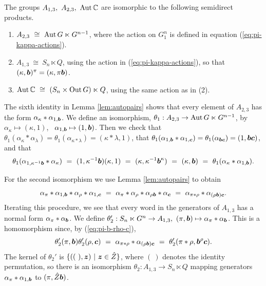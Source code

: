 \begin{prop}
The groups $A_{1,3},~ A_{2,3},~ \mathrm{Aut}\,\mathbb{C}$ 
are isomorphic to the following semidirect products.  
\begin{enumerate}[(1)]  
\item 
$A_{2,3} ~\cong~ \mathrm{Aut}\,G \ltimes G^{n-1}$, 
where the action on $G^n_1$ is defined in equation (\ref{eq:pi-kappa-actions}).
\item
$A_{1,3} ~\cong~ S_n \ltimes Q$,  
using the action in (\ref{eq:pi-kappa-actions}), so that  
$(\kappa,\boldsymbol{b})^{\pi} = (\kappa,\pi\boldsymbol{b})$. 
\item
$\mathrm{Aut}\,\mathbb{C} ~\cong~ (S_n \times \mathrm{Out}\,G) \ltimes Q$, 
using the same action as in (2). 
\end{enumerate} 
\end{prop}
\begin{pf} 
The sixth identity in Lemma \ref{lem:autopairs} shows that every element 
of $A_{2,3}$ has the form $\alpha_{\kappa}*\alpha_{1,\boldsymbol{b}}$. 
We define an isomorphism, 
$\theta_1 : A_{2,3} \to \mathrm{Aut}\,G \ltimes G^{n-1}$, by 
$\alpha_{\kappa} \mapsto (\kappa,1)$,~ $\alpha_{1,\boldsymbol{b}} \mapsto (1,\boldsymbol{b})$. 
Then we check that 
$\theta_1(\alpha_{\kappa}*\alpha_{\lambda}) 
 = \theta_1(\alpha_{\kappa*\lambda}) 
 = (\kappa*\lambda,1)$, that 
$\theta_1(\alpha_{1,\boldsymbol{b}}*\alpha_{1,\boldsymbol{c}}) 
 = \theta_1(\alpha_{\boldsymbol{b}\boldsymbol{c}}) 
 = (1,\boldsymbol{b}\boldsymbol{c})$, and that 
$$
\theta_1(\alpha_{1,\kappa^{-1}\boldsymbol{b}}*\alpha_{\kappa}) 
~=~ (1,\kappa^{-1}\boldsymbol{b})(\kappa,1) 
~=~ (\kappa,\kappa^{-1}\boldsymbol{b}^{\kappa}) 
~=~ (\kappa,\boldsymbol{b}) 
~=~ \theta_1(\alpha_{\kappa}*\alpha_{1,\boldsymbol{b}}). 
$$

\medskip\noindent 
For the second isomorphism we use Lemma \ref{lem:autopairs} to obtain  
\begin{equation} \label{eq:pi-b-rho-c}
\alpha_{\pi} * \alpha_{1,\boldsymbol{b}} * \alpha_{\rho} * \alpha_{1,\boldsymbol{c}} 
~=~ \alpha_{\pi} * \alpha_{\rho} * \alpha_{\rho\boldsymbol{b}} * \alpha_{\boldsymbol{c}} 
~=~ \alpha_{\pi*\rho} * \alpha_{(\rho\boldsymbol{b})\boldsymbol{c}}.
\end{equation}
Iterating this procedure, we see that every word in the generators 
of $A_{1,3}$ has a normal form $\alpha_{\pi}*\alpha_{\boldsymbol{b}}$. 
We define  
$\theta_2' : S_n \ltimes G^n \to A_{1,3},~ 
             (\pi,\boldsymbol{b}) \mapsto \alpha_{\pi}*\alpha_{\boldsymbol{b}}$.  
This is a homomorphism since, by (\ref{eq:pi-b-rho-c}), 
$$
\theta_2'(\pi,\boldsymbol{b})\theta_2'(\rho,\boldsymbol{c}) 
~=~ \alpha_{\pi*\rho} * \alpha_{(\rho\boldsymbol{b})\boldsymbol{c}} 
~=~ \theta_2'(\pi*\rho,\boldsymbol{b}^{\rho}\boldsymbol{c}). 
$$
The kernel of $\theta_2'$ is $\{((~),\boldsymbol{z}) ~|~ \boldsymbol{z} \in \hat{Z}\}$, 
where $(~)$ denotes the identity permutation, 
so there is an isomorphism $\theta_2 : A_{1,3} \to S_n \ltimes Q$ 
mapping generators $\alpha_{\pi}*\alpha_{1,\boldsymbol{b}}$ 
to $(\pi,\hat{Z}\boldsymbol{b})$. 


\end{pf}
